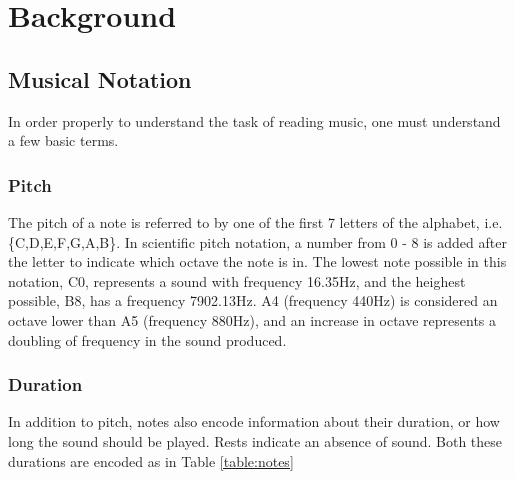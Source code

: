 \section{Background}
    \subsection{Musical Notation}
        In order properly to understand the task of reading music, one must understand a few basic terms.

        \subsubsection{Pitch}
            The pitch of a note is referred to by one of the first 7 letters of the alphabet, i.e. \{C,D,E,F,G,A,B\}.
            In scientific pitch notation, a number from 0 - 8 is added after the letter to indicate which octave the note is in.
            The lowest note possible in this notation, C0, represents a sound with frequency 16.35Hz, and the heighest possible, B8, has a frequency 7902.13Hz.
            A4 (frequency 440Hz) is considered an octave lower than A5 (frequency 880Hz), and an increase in octave represents a doubling of frequency in the sound produced.
        \subsubsection{Duration}
            In addition to pitch, notes also encode information about their duration, or how long the sound should be played. 
            Rests indicate an absence of sound. Both these durations are encoded as in Table \ref{table:notes}

